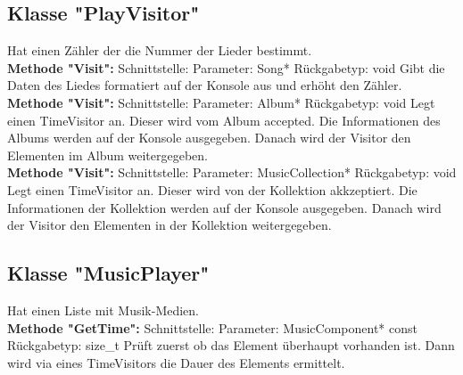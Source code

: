 \documentclass[12pt,a4paper]{article}
\begin{document}
\subsection {Klasse "PlayVisitor"}
Hat einen Zähler der die Nummer der Lieder bestimmt.
\\

\textbf {Methode "Visit": } 
\newline
Schnittstelle: 
\newline
Parameter: Song*
\newline
Rückgabetyp: void
\newline
Gibt die Daten des Liedes formatiert auf der Konsole aus und erhöht den Zähler.
\\

\textbf {Methode "Visit": } 
\newline
Schnittstelle: 
\newline
Parameter: Album*
\newline
Rückgabetyp: void
\newline
Legt einen TimeVisitor an. Dieser wird vom Album accepted. Die Informationen des Albums werden auf der Konsole ausgegeben. Danach wird der Visitor den Elementen im Album weitergegeben.
\\

\textbf {Methode "Visit": } 
\newline
Schnittstelle: 
\newline
Parameter: MusicCollection*
\newline
Rückgabetyp: void
\newline
Legt einen TimeVisitor an. Dieser wird von der Kollektion akkzeptiert. Die Informationen der Kollektion werden auf der Konsole ausgegeben. Danach wird der Visitor den Elementen in der Kollektion weitergegeben.
\\

\subsection {Klasse "MusicPlayer"}
Hat einen Liste mit Musik-Medien.
\\

\textbf {Methode "GetTime": } 
\newline
Schnittstelle: 
\newline
Parameter: MusicComponent* const
\newline
Rückgabetyp: size\_t
\newline
Prüft zuerst ob das Element überhaupt vorhanden ist. Dann wird via eines TimeVisitors die Dauer des Elements ermittelt.
\\
\end{document}
